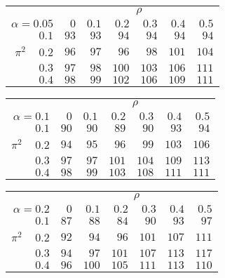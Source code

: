 \begin{tabular}{r|rrrrrr}
\hline\hline
 &\multicolumn{6}{c}{$\rho$} \\ 
 $\alpha = 0.05$ & $0$ & $0.1$ & $0.2$ & $0.3$ & $0.4$ & $0.5$ \\ 
 \hline$0.1$ & $ 93$ & $ 93$ & $ 94$ & $ 94$ & $ 94$ & $ 94$\\ 
$\pi^2\;\;\;$ $0.2$ & $ 96$ & $ 97$ & $ 96$ & $ 98$ & $101$ & $104$\\ 
$0.3$ & $ 97$ & $ 98$ & $100$ & $103$ & $106$ & $111$\\ 
$0.4$ & $ 98$ & $ 99$ & $102$ & $106$ & $109$ & $111$\\ 
 \hline 
 \end{tabular}
 
 \vspace{2em} 
 
\begin{tabular}{r|rrrrrr}
\hline\hline
 &\multicolumn{6}{c}{$\rho$} \\ 
 $\alpha = 0.1$ & $0$ & $0.1$ & $0.2$ & $0.3$ & $0.4$ & $0.5$ \\ 
 \hline$0.1$ & $ 90$ & $ 90$ & $ 89$ & $ 90$ & $ 93$ & $ 94$\\ 
$\pi^2\;\;\;$ $0.2$ & $ 94$ & $ 95$ & $ 96$ & $ 99$ & $103$ & $106$\\ 
$0.3$ & $ 97$ & $ 97$ & $101$ & $104$ & $109$ & $113$\\ 
$0.4$ & $ 98$ & $ 99$ & $103$ & $108$ & $111$ & $111$\\ 
 \hline 
 \end{tabular}
 
 \vspace{2em} 
 
\begin{tabular}{r|rrrrrr}
\hline\hline
 &\multicolumn{6}{c}{$\rho$} \\ 
 $\alpha = 0.2$ & $0$ & $0.1$ & $0.2$ & $0.3$ & $0.4$ & $0.5$ \\ 
 \hline$0.1$ & $ 87$ & $ 88$ & $ 84$ & $ 90$ & $ 93$ & $ 97$\\ 
$\pi^2\;\;\;$ $0.2$ & $ 92$ & $ 94$ & $ 96$ & $101$ & $107$ & $111$\\ 
$0.3$ & $ 94$ & $ 97$ & $101$ & $107$ & $113$ & $117$\\ 
$0.4$ & $ 96$ & $100$ & $105$ & $111$ & $113$ & $110$\\ 
 \hline 
 \end{tabular}